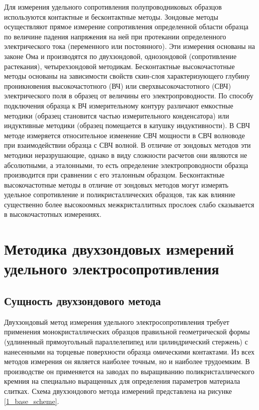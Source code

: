 Для измерения удельного сопротивления полупроводниковых образцов используются контактные и бесконтактные методы.
Зондовые методы осуществляют прямое измерение сопротивления определенной области образца по величине падения напряжения на ней при протекании определенного электрического тока (переменного или постоянного). Эти измерения основаны на законе Ома и производятся по двухзондовой, однозондовой (сопротивление растекания), четырехзондовой методикам.
Бесконтактные высокочастотные методы основаны на зависимости свойств скин-слоя характеризующего глубину проникновения высокочастотного (ВЧ) или сверхвысокочастотного (СВЧ) электрического поля в образец от величины его электропроводности. По способу подключения образца к ВЧ измерительному контуру различают емкостные методики (образец становится частью измерительного конденсатора) или индуктивные методики (образец помещается в катушку индуктивности). В СВЧ методе измеряется относительное изменение СВЧ мощности в СВЧ волноводе при взаимодействии образца с СВЧ волной. В отличие от зондовых методов эти методики неразрушающие, однако в виду сложности расчетов они являются не абсолютными, а эталонными, то есть определение электропроводности образца производится при сравнении с его эталонным образцом. Бесконтактные высокочастотные методы в отличие от зондовых методов могут измерять удельное сопротивление и поликристаллических образцов, так как влияние существенно более высокоомных межкристаллитных прослоек слабо сказывается в высокочастотных измерениях.

\section{Методика двухзондовых измерений удельного электросопротивления}

\subsection{Сущность двухзондового метода}

Двухзондовый метод измерения удельного электросопротивления требует применения монокристаллических образцов правильной геометрической формы (удлиненный прямоугольный параллелепипед или цилиндрический стержень) с нанесенными на торцевые поверхности образца омическими контактами. Из всех методов измерения он является наиболее точным, но и наиболее трудоемким. В производстве он применяется на заводах по выращиванию поликристаллического кремния на специально выращенных для определения параметров материала слитках. Схема двухзондового метода измерений представлена на рисунке \ref{1_base_scheme}.

